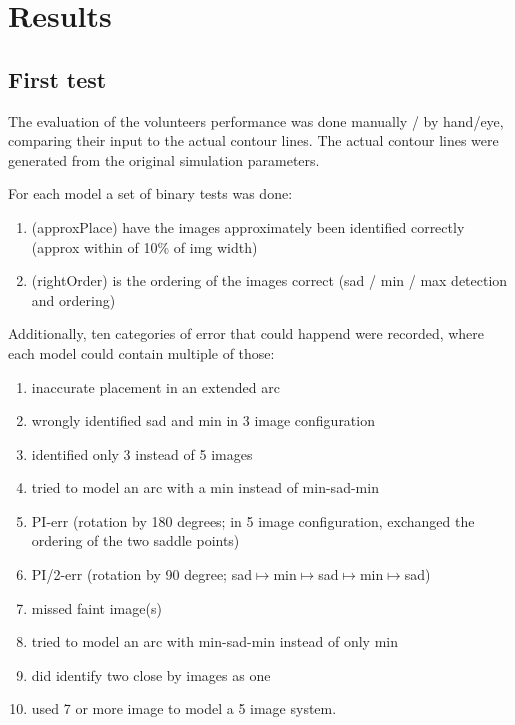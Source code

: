 
\section{Results} \label{sec:results}

\subsection{First test} \label{sec:results.1}

The evaluation of the volunteers performance was done manually / by hand/eye, comparing their input to the actual contour lines.
The actual contour lines were generated from the original simulation parameters.

For each model a set of binary tests was done:

\begin{enumerate}
  \item (approxPlace) have the images approximately been identified correctly (approx within of 10\% of img width)
  \item (rightOrder) is the ordering of the images correct (sad / min / max detection and ordering)
\end{enumerate}

Additionally, ten categories of error that could happend were recorded, where each model could contain multiple of those:

\begin{enumerate}
  \item inaccurate placement in an extended arc
  \item wrongly identified sad and min in 3 image configuration
  \item identified only 3 instead of 5 images
  \item tried to model an arc with a min instead of min-sad-min
  \item PI-err (rotation by 180 degrees; in 5 image configuration, exchanged the ordering of the two saddle points)
  \item PI/2-err (rotation by 90 degree; sad$\longmapsto$min$\longmapsto$sad$\longmapsto$min$\longmapsto$sad)
  \item missed faint image(s)
  \item tried to model an arc with min-sad-min instead of only min
  \item did identify two close by images as one
  \item used 7 or more image to model a 5 image system.
\end{enumerate}

